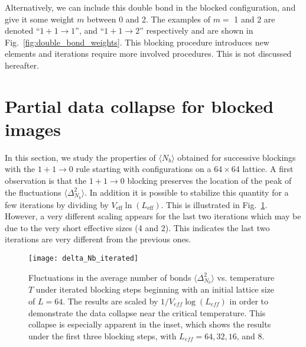 \documentclass[../main.tex]{subfiles}
\begin{document}
Alternatively, we can include this double bond in the blocked configuration, and give it some weight $m$ between 0 and
2.  The examples of $m=$ 1 and 2 are denoted ``$1+1\rightarrow 1$'', and ``$1+1\rightarrow 2$'' respectively and are
shown in Fig.~\ref{fig:double_bond_weights}. This blocking procedure introduces new elements and iterations require
more involved procedures. This is not discussed hereafter. 

\section{Partial data collapse for blocked images}
\label{sec:collapse}
In this section, we study the properties of $\langle N_b\rangle$  obtained for successive blockings with the
$1+1\rightarrow0$ rule starting with configurations on a $64\times64$ lattice.  A first observation is that the
$1+1\rightarrow0$ blocking preserves the location of the peak of the fluctuations $\langle\Delta_{N_b}^2\rangle$. In
addition it is possible to stabilize this quantity for a few iterations by dividing by
$V_{\text{eff}}\ln(L_{\text{eff}})$. This is illustrated in Fig.~\ref{fig:delta_Nb_iterated}.  However, a very
different scaling appears for the last two iterations which may be due to the very short effective sizes (4 and 2).
This indicates the last two iterations are very different from the previous ones. 
\begin{figure}[htpb]
    \centering
    \texttt{[image: delta\_Nb\_iterated]}\hfill
    \caption{Fluctuations in the average number of bonds $\langle
        \Delta_{N_b}^2\rangle$ vs. temperature $T$ under iterated blocking
        steps beginning with an initial lattice size of $L = 64$. The results
        are scaled by $1 / V_{eff}\log(L_{eff})$ in order to demonstrate the
        data collapse near the critical temperature. This collapse is
        especially apparent in the inset, which shows the results under the
        first three blocking steps, with $L_{eff} = 64, 32, 16$, and $8$.}
    \label{fig:delta_Nb_iterated}
\end{figure}
\end{document}
